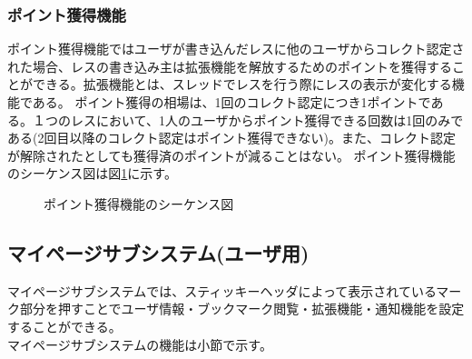 \documentclass[a4j]{jarticle}
\begin{document}
  \subsubsection{ポイント獲得機能}
  ポイント獲得機能ではユーザが書き込んだレスに他のユーザからコレクト認定された場合、レスの書き込み主は拡張機能を解放するためのポイントを獲得することができる。拡張機能とは、スレッドでレスを行う際にレスの表示が変化する機能である。
  ポイント獲得の相場は、1回のコレクト認定につき1ポイントである。１つのレスにおいて、1人のユーザからポイント獲得できる回数は1回のみである(2回目以降のコレクト認定はポイント獲得できない)。また、コレクト認定が解除されたとしても獲得済のポイントが減ることはない。
  ポイント獲得機能のシーケンス図は図\ref{fig:correct_point.png}に示す。

  \begin{figure}[H]
    \centering
    \caption{ポイント獲得機能のシーケンス図}
    \label{fig:correct_point.png}
  \end{figure}


  \subsection{マイページサブシステム(ユーザ用)}
  マイページサブシステムでは、スティッキーヘッダによって表示されているマーク部分を押すことでユーザ情報・ブックマーク閲覧・拡張機能・通知機能を設定することができる。\\
  マイページサブシステムの機能は小節で示す。
\end{document}
